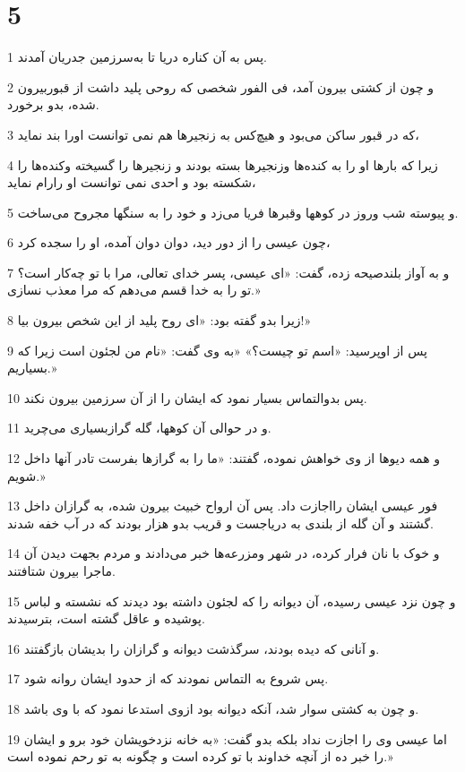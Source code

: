 \chapter{5}

\par 1 پس به آن کناره دریا تا به‌سرزمین جدریان آمدند.
\par 2 و چون از کشتی بیرون آمد، فی الفور شخصی که روحی پلید داشت از قبوربیرون شده، بدو برخورد.
\par 3 که در قبور ساکن می‌بود و هیچ‌کس به زنجیرها هم نمی توانست اورا بند نماید،
\par 4 زیرا که بارها او را به کنده‌ها وزنجیرها بسته بودند و زنجیرها را گسیخته وکنده‌ها را شکسته بود و احدی نمی توانست او رارام نماید،
\par 5 و پیوسته شب وروز در کوهها وقبرها فریا می‌زد و خود را به سنگها مجروح می‌ساخت.
\par 6 چون عیسی را از دور دید، دوان دوان آمده، او را سجده کرد،
\par 7 و به آواز بلندصیحه زده، گفت: «ای عیسی، پسر خدای تعالی، مرا با تو چه‌کار است؟ تو را به خدا قسم می‌دهم که مرا معذب نسازی.»
\par 8 زیرا بدو گفته بود: «ای روح پلید از این شخص بیرون بیا!»
\par 9 پس از اوپرسید: «اسم تو چیست؟» «به وی گفت: «نام من لجئون است زیرا که بسیاریم.»
\par 10 پس بدوالتماس بسیار نمود که ایشان را از آن سرزمین بیرون نکند.
\par 11 و در حوالی آن کوهها، گله گرازبسیاری می‌چرید.
\par 12 و همه دیوها از وی خواهش نموده، گفتند: «ما را به گرازها بفرست تادر آنها داخل شویم.»
\par 13 فور عیسی ایشان رااجازت داد. پس آن ارواح خبیث بیرون شده، به گرازان داخل گشتند و آن گله از بلندی به دریاجست و قریب بدو هزار بودند که در آب خفه شدند.
\par 14 و خوک با نان فرار کرده، در شهر ومزرعه‌ها خبر می‌دادند و مردم بجهت دیدن آن ماجرا بیرون شتافتند.
\par 15 و چون نزد عیسی رسیده، آن دیوانه را که لجئون داشته بود دیدند که نشسته و لباس پوشیده و عاقل گشته است، بترسیدند.
\par 16 و آنانی که دیده بودند، سرگذشت دیوانه و گرازان را بدیشان بازگفتند.
\par 17 پس شروع به التماس نمودند که از حدود ایشان روانه شود.
\par 18 و چون به کشتی سوار شد، آنکه دیوانه بود ازوی استدعا نمود که با وی باشد.
\par 19 اما عیسی وی را اجازت نداد بلکه بدو گفت: «به خانه نزدخویشان خود برو و ایشان را خبر ده از آنچه خداوند با تو کرده است و چگونه به تو رحم نموده است.»
